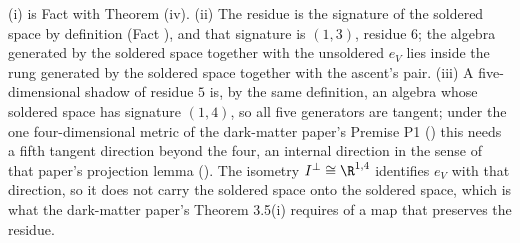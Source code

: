 (i) is Fact  with Theorem (iv). (ii) The residue is the signature of the soldered space by definition (Fact ), and that signature is $(1,3)$, residue $6$; the algebra generated by the soldered space together with the unsoldered $e_{V}$ lies inside the rung generated by the soldered space together with the ascent's pair. (iii) A five-dimensional shadow of residue $5$ is, by the same definition, an algebra whose soldered space has signature $(1,4)$, so all five generators are tangent; under the one four-dimensional metric of the dark-matter paper's Premise P1 () this needs a fifth tangent direction beyond the four, an internal direction in the sense of that paper's projection lemma \cite[Lem.~6.1]{ButlerT14} (). The isometry $I^{\perp} \cong \R^{1,4}$ identifies $e_{V}$ with that direction, so it does not carry the soldered space onto the soldered space, which is what the dark-matter paper's Theorem 3.5(i) requires of a map that preserves the residue.
